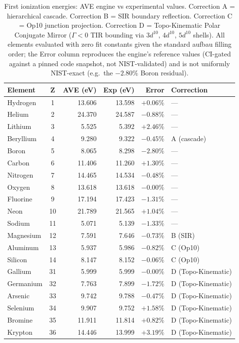 \begin{table}[htbp]
    \centering
    \small
    \renewcommand{\arraystretch}{1.15}
    \begin{tabularx}{\textwidth}{@{}l c r r r X@{}}
    \hline\hline
    \textbf{Element} & \textbf{Z} & \textbf{AVE (eV)} & \textbf{Exp (eV)} & \textbf{Error} & \textbf{Correction} \\
    \hline
    Hydrogen   & 1  & 13.606 & 13.598 & $+0.06\%$ & --- \\
    Helium     & 2  & 24.370 & 24.587 & $-0.88\%$ & --- \\
    Lithium    & 3  &  5.525 &  5.392 & $+2.46\%$ & --- \\
    Beryllium  & 4  &  9.280 &  9.322 & $-0.45\%$ & A (cascade) \\
    Boron      & 5  &  8.065 &  8.298 & $-2.80\%$ & --- \\
    Carbon     & 6  & 11.406 & 11.260 & $+1.30\%$ & --- \\
    Nitrogen   & 7  & 14.465 & 14.534 & $-0.48\%$ & --- \\
    Oxygen     & 8  & 13.618 & 13.618 & $-0.00\%$ & --- \\
    Fluorine   & 9  & 17.194 & 17.423 & $-1.31\%$ & --- \\
    Neon       & 10 & 21.789 & 21.565 & $+1.04\%$ & --- \\
    Sodium     & 11 &  5.071 &  5.139 & $-1.33\%$ & --- \\
    Magnesium  & 12 &  7.591 &  7.646 & $-0.73\%$ & B (SIR) \\
    Aluminum   & 13 &  5.937 &  5.986 & $-0.82\%$ & C (Op10) \\
    Silicon    & 14 &  8.147 &  8.152 & $-0.06\%$ & C (Op10) \\
    \hline
    Gallium    & 31 &  5.999 &  5.999 & $-0.00\%$ & D (Topo-Kinematic) \\
    Germanium  & 32 &  7.763 &  7.899 & $-1.72\%$ & D (Topo-Kinematic) \\
    Arsenic    & 33 &  9.742 &  9.788 & $-0.47\%$ & D (Topo-Kinematic) \\
    Selenium   & 34 &  9.907 &  9.752 & $+1.58\%$ & D (Topo-Kinematic) \\
    Bromine    & 35 & 11.911 & 11.814 & $+0.82\%$ & D (Topo-Kinematic) \\
    Krypton    & 36 & 14.446 & 13.999 & $+3.19\%$ & D (Topo-Kinematic) \\
    \hline\hline
    \end{tabularx}
    \caption{First ionization energies: AVE engine vs experimental values. Correction A = hierarchical cascade. Correction B = SIR boundary reflection. Correction C = Op10 junction projection. Correction D = Topo-Kinematic Polar Conjugate Mirror ($\Gamma < 0$ TIR bounding via $3d^{10}$, $4d^{10}$, $5d^{10}$ shells). All elements evaluated with zero fit constants given the standard aufbau filling order; the Error column reproduces the engine's reference values (CI-gated against a pinned code snapshot, not NIST-validated) and is not uniformly NIST-exact (e.g.\ the $-2.80\%$ Boron residual).}
    \label{tab:ie_summary}
\end{table}

